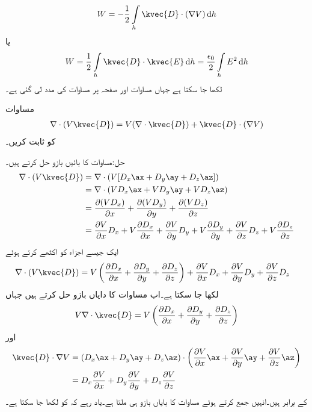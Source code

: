\begin{align*}
W=-\frac{1}{2} \int \limits_h \kvec{D} \cdot (\nabla V) \dif h
\end{align*}
یا
\begin{align}\label{مساوات_توانائی_کثافت_توانائی_ب}
W=\frac{1}{2} \int \limits_h \kvec{D} \cdot \kvec{E} \dif h=\frac{\epsilon_0}{2}\int \limits_h  E^2 \dif h
\end{align}
لکھا جا سکتا ہے جہاں  مساوات  اور صفحہ  پر مساوات  کی مدد لی گئی ہے۔

مساوات 
\begin{align*}
\nabla \cdot  (V \kvec{D})=V (\nabla \cdot \kvec{D})+\kvec{D} \cdot (\nabla V)
\end{align*}
 کو ثابت کریں۔

حل:مساوات  کا بائیں بازو حل کرتے ہیں۔
\begin{align*}
\nabla \cdot (V \kvec{D})&=\nabla \cdot (V[D_x\ax+D_y\ay+D_z\az])\\
&=\nabla \cdot (V D_x\ax+V D_y\ay+VD_z\az)\\
&=\frac{\partial (V D_x)}{\partial x}+\frac{\partial (V D_y)}{\partial y}+\frac{\partial (V D_z)}{\partial z}\\
&=\frac{\partial V}{\partial x} D_x +V\frac{\partial D_x}{\partial x}+\frac{\partial V}{\partial y} D_y +V\frac{\partial D_y}{\partial y}+\frac{\partial V}{\partial z} D_z +V\frac{\partial D_z}{\partial z}
\end{align*}
ایک جیسے اجزاء کو اکٹھے کرتے ہوئے
\begin{align*}
\nabla \cdot (V \kvec{D})&=V\left(\frac{\partial D_x}{\partial x}+\frac{\partial D_y}{\partial y}+\frac{\partial D_z}{\partial z}\right)+\frac{\partial V}{\partial x} D_x +\frac{\partial V}{\partial y} D_y +\frac{\partial V}{\partial z} D_z 
\end{align*}
لکھا جا سکتا ہے۔اب مساوات  کا دایاں بازو حل کرتے ہیں جہاں 
\begin{align*}
V \nabla \cdot \kvec{D}=V \left(\frac{\partial D_x}{\partial x}+\frac{\partial D_y}{\partial y}+\frac{\partial D_z}{\partial z} \right)
\end{align*}
اور
\begin{align*}
\kvec{D} \cdot \nabla V&=(D_x\ax+D_y\ay+D_z\az) \cdot \left(\frac{\partial V}{\partial x}\ax +\frac{\partial V}{\partial y}\ay+\frac{\partial V}{\partial z}\az\right)\\
&= D_x\frac{\partial V}{\partial x} + D_y\frac{\partial V}{\partial y} +D_z\frac{\partial V}{\partial z}  
\end{align*}
کے برابر ہیں۔انہیں جمع کرتے ہوئے مساوات  کا بایاں بازو ہی ملتا ہے۔یاد رہے کہ  کو  لکھا جا سکتا  ہے۔

